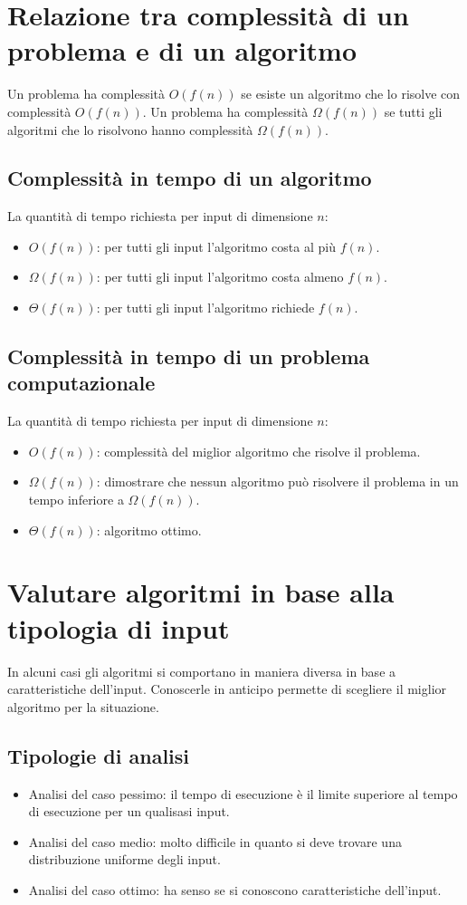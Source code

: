 \section{Relazione tra complessit\`a di un problema e di un algoritmo}
Un problema ha complessit\`a $O(f(n))$ se esiste un algoritmo che lo risolve con complessit\`a $O(f(n))$. Un problema ha complessit\`a $\Omega(f(n))$ se
tutti gli algoritmi che lo risolvono hanno complessit\`a $\Omega(f(n))$.
\subsection{Complessit\`a in tempo di un algoritmo}
La quantit\`a di tempo richiesta per input di dimensione $n$:
\begin{itemize}
\item $O(f(n))$: per tutti gli input l'algoritmo costa al pi\`u $f(n)$.
\item $\Omega(f(n))$: per tutti gli input l'algoritmo costa almeno $f(n)$.
\item $\Theta(f(n))$: per tutti gli input l'algoritmo richiede $f(n)$.
\end{itemize}
\subsection{Complessit\`a in tempo di un problema computazionale}
La quantit\`a di tempo richiesta per input di dimensione $n$:
\begin{itemize}
\item $O(f(n))$: complessit\`a del miglior algoritmo che risolve il problema.
\item $\Omega(f(n))$: dimostrare che nessun algoritmo pu\`o risolvere il problema in un tempo inferiore a $\Omega(f(n))$.
\item $\Theta(f(n))$: algoritmo ottimo.
\end{itemize}
\section{Valutare algoritmi in base alla tipologia di input}
In alcuni casi gli algoritmi si comportano in maniera diversa in base a caratteristiche dell'input. Conoscerle in anticipo permette di scegliere il miglior
algoritmo per la situazione. 
\subsection{Tipologie di analisi}
\begin{itemize}
\item Analisi del caso pessimo: il tempo di esecuzione \`e il limite superiore al tempo di esecuzione per un qualisasi input. 
\item Analisi del caso medio: molto difficile in quanto si deve trovare una distribuzione uniforme degli input.
\item Analisi del caso ottimo: ha senso se si conoscono caratteristiche dell'input.
\end{itemize}
